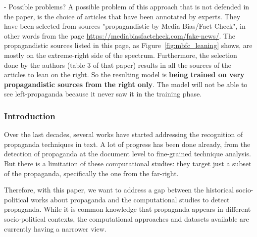 - Possible problems?
A possible problem of this approach that is not defended in the paper, is the choice of articles that have been annotated by experts. They have been selected from sources "propagandistic by Media Bias/Fact Check", in other words from the page \url{https://mediabiasfactcheck.com/fake-news/}. The propagandistic sources listed in this page, as Figure~\ref{fig:mbfc_leaning} shows, are mostly on the extreme-right side of the spectrum. Furthermore, the selection done by the authors (table 3 of that paper) results in all the sources of the articles to lean on the right.
So the resulting model is \textbf{being trained on very propagandistic sources from the right only}. The model will not be able to see left-propaganda because it never saw it in the training phase.

\subsubsection{Introduction}

Over the last decades, several works have started addressing the recognition of propaganda techniques in text. A lot of progress has been done already, from the detection of propaganda at the document level to fine-grained technique analysis. But there is a limitation of these computational studies: they target just a subset of the propaganda, specifically the one from the far-right. %





Therefore, with this paper, we want to address a gap between the historical socio-political works about propaganda and the computational studies to detect propaganda.
While it is common knowledge that propaganda appears in different socio-political contexts, the computational approaches and datasets available are currently having a narrower view.


